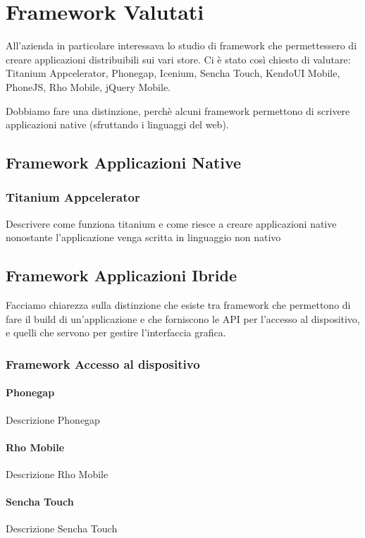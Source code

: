 \chapter{Framework Valutati}
	All'azienda in particolare interessava lo studio di framework che
	permettessero di creare applicazioni distribuibili sui vari store.
	Ci è stato così chiesto di valutare: Titanium Appcelerator, Phonegap,
	Icenium, Sencha Touch, KendoUI Mobile, PhoneJS, Rho Mobile, jQuery Mobile.
	
	Dobbiamo fare una distinzione, perchè alcuni framework permettono di
	scrivere applicazioni native (sfruttando i linguaggi del web).
	
	\section{Framework Applicazioni Native}
	
		\subsection{Titanium Appcelerator}
			Descrivere come funziona titanium e come riesce a creare
			applicazioni native nonostante l'applicazione venga scritta in
			linguaggio non nativo
			
	\section{Framework Applicazioni Ibride}
		Facciamo chiarezza sulla distinzione che esiste tra framework che
		permettono di fare il build di un'applicazione e che forniscono le API
		per l'accesso al dispositivo, e quelli che servono per gestire
		l'interfaccia grafica.
	
		\subsection{Framework Accesso al dispositivo}
	
			\subsubsection{Phonegap}
				Descrizione Phonegap
	
			\subsubsection{Rho Mobile}
				Descrizione Rho Mobile
	
			\subsubsection{Sencha Touch}
				Descrizione Sencha Touch
	
